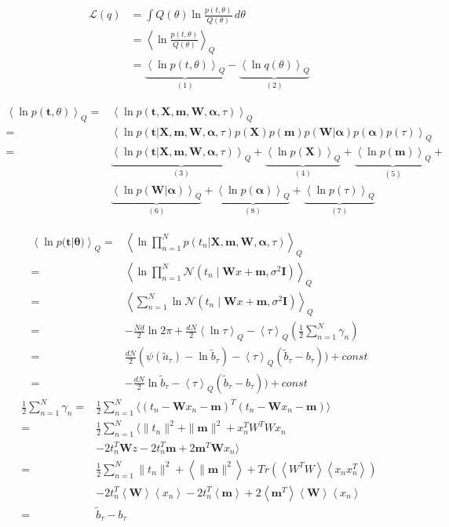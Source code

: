 \documentclass[10pt]{article}
\newcommand{\Angle}[1]{\left \langle #1 \right \rangle}
\newcommand{\Eq}[1]{\Angle{#1}_Q}
\newcommand{\N}[2][]{\mathcal{N} \left( #1,#2 \right)}
\newcommand{\Tr}[1]{Tr\left( #1 \right)}
\begin{document}
	\begin{align}
		\mathcal{L}(q)&=\int Q(\theta) \ln{\frac{p(t,\theta)}{Q(\theta)}} \, d\theta \\
		&=\Eq{\ln{\frac{p(t,\theta)}{Q(\theta)}}} \\
		&=\underbrace{\Eq{\ln{p(t,\theta)}}}_{(1)} - \underbrace{\Eq{\ln{q(\theta)}}}_{(2)}
	\end{align}
	
	\begin{align}
		\Eq{\ln{p(\bm{t},\theta)}}=&\Eq{\ln{p(\bm{t},\bm{X},\bm{m},\bm{W},\bm{\alpha},\tau)}} \\
		=&\Eq{\ln{p(\bm{t}|\bm{X},\bm{m},\bm{W},\bm{\alpha},\tau)p(\bm{X})p(\bm{m})p(\bm{W} \vert \bm{\alpha})p(\bm{\alpha})p(\tau)}} \\
		=&\underbrace{\Eq{\ln{p(\bm{t}|\bm{X},\bm{m},\bm{W},\bm{\alpha},\tau)}}}_{(3)}+\underbrace{\Eq{\ln{p(\bm{X})}}}_{(4)}+\underbrace{\Eq{\ln{p(\bm{m})}}}_{(5)}+\\
		& \underbrace{\Eq{\ln{p(\bm{W}\vert \bm{\alpha})}}}_{(6)}+\underbrace{\Eq{\ln{p(\bm{\alpha})}}}_{(8)}+\underbrace{\Eq{\ln{p(\tau)}}}_{(7)} \nonumber
	\end{align}
	
	\begin{align}
		\Eq{\ln{p(\bm{t}|\bm{\theta)}}}=&\Eq{\ln{\prod_{n=1}^{N}{p(t_n|\bm{X},\bm{m},\bm{W},\bm{\alpha},\tau)}}} \\
		=&\Eq{\ln{\prod_{n=1}^{N}{\N[t_n \mid \bm{W}x+\bm{m}]{\sigma^2\bm{I}}}}} \\
		=&\Eq{\sum_{n=1}^{N}{\ln{\N[t_n \mid \bm{W}x+\bm{m}]{\sigma^2\bm{I}}}}} \\
		=&-\frac{Nd}{2}\ln{2\pi}+\frac{dN}{2}\Eq{\ln{\tau}}-\Eq{\tau}\left(\frac{1}{2}\sum_{n=1}^{N}{\gamma_n}\right) \\
		=&\frac{dN}{2}(\psi(\tilde{a}_\tau)-\ln{\tilde{b}_\tau})-\Eq{\tau}(\tilde{b}_\tau-b_\tau)) + const \\
		=&-\frac{dN}{2}\ln{\tilde{b}_\tau}-\Eq{\tau}(\tilde{b}_\tau-b_\tau)) + const
	\end{align}
	\begin{align}
		\frac{1}{2}\sum_{n=1}^N \gamma_n=&\frac{1}{2}\sum_{n=1}^N\langle(t_n-\bm{W}x_n-\bm{m})^T(t_n-\bm{W}x_n-\bm{m})\rangle \\
		=& \frac{1}{2}\sum_{n=1}^N \langle \|t_n\|^2+\|\bm{m}\|^2+x_n^TW^TWx_n \\
		&-2t_n^T\bm{W}z-2t_n^T\bm{m}+2\bm{m}^T\bm{W}x_n \rangle \nonumber \\ 
		=&\frac{1}{2}\sum_{n=1}^N \|t_n\|^2+\Angle{\|\bm{m}\|^2}+\Tr{\Angle{W^TW}\Angle{x_nx_n^T}} \\
		&-2t_n^T\Angle{\bm{W}}\Angle{x_n}-2t_n^T\Angle{\bm{m}}+2\Angle{\bm{m}^T}\Angle{\bm{W}}\Angle{x_n} \\
		=& \tilde{b}_\tau-b_\tau
	\end{align}
	
\end{document}
